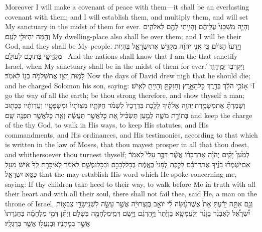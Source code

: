 {Moreover I will make a covenant of peace with them—it shall be an everlasting covenant with them; and I will establish them, and multiply them, and will set My sanctuary in the midst of them for ever.}
{וְהָיָ֤ה מִשְׁכָּנִי֙ עֲלֵיהֶ֔ם וְהָיִ֥יתִי לָהֶ֖ם לֵאלֹהִ֑ים וְהֵ֖מָּה יִהְיוּ\maqqaf לִ֥י לְעָֽם׃}
{My dwelling-place also shall be over them; and I will be their God, and they shall be My people.}
{וְיָֽדְעוּ֙ הַגּוֹיִ֔ם כִּ֚י אֲנִ֣י יְהֹוָ֔ה מְקַדֵּ֖שׁ אֶת\maqqaf יִשְׂרָאֵ֑ל בִּהְי֧וֹת מִקְדָּשִׁ֛י בְּתוֹכָ֖ם לְעוֹלָֽם׃ \petucha }
{And the nations shall know that I am the \lord\space that sanctify Israel, when My sanctuary shall be in the midst of them for ever.’}
\label{haft_12}
\setcounter{chap}{2}
\setcounter{verse}{1}
{וַיִּקְרְב֥וּ יְמֵֽי\maqqaf דָוִ֖ד לָמ֑וּת וַיְצַ֛ו אֶת\maqqaf שְׁלֹמֹ֥ה בְנ֖וֹ לֵאמֹֽר׃}
{Now the days of David drew nigh that he should die; and he charged Solomon his son, saying:}
{אָנֹכִ֣י הֹלֵ֔ךְ בְּדֶ֖רֶךְ כׇּל\maqqaf הָאָ֑רֶץ וְחָזַקְתָּ֖ וְהָיִ֥יתָֽ לְאִֽישׁ׃}
{‘I go the way of all the earth; be thou strong therefore, and show thyself a man;}
{וְשָׁמַרְתָּ֞ אֶת\maqqaf מִשְׁמֶ֣רֶת \legarmeh  יְהֹוָ֣ה אֱלֹהֶ֗יךָ לָלֶ֤כֶת בִּדְרָכָיו֙ לִשְׁמֹ֨ר חֻקֹּתָ֤יו מִצְוֺתָיו֙ וּמִשְׁפָּטָ֣יו וְעֵדְוֺתָ֔יו כַּכָּת֖וּב בְּתוֹרַ֣ת מֹשֶׁ֑ה לְמַ֣עַן תַּשְׂכִּ֗יל אֵ֚ת כׇּל\maqqaf אֲשֶׁ֣ר תַּעֲשֶׂ֔ה וְאֵ֛ת כׇּל\maqqaf אֲשֶׁ֥ר תִּפְנֶ֖ה שָֽׁם׃}
{and keep the charge of the \lord\space thy God, to walk in His ways, to keep His statutes, and His commandments, and His ordinances, and His testimonies, according to that which is written in the law of Moses, that thou mayest prosper in all that thou doest, and whithersoever thou turnest thyself;}
{לְמַ֩עַן֩ יָקִ֨ים יְהֹוָ֜ה אֶת\maqqaf דְּבָר֗וֹ אֲשֶׁ֨ר דִּבֶּ֣ר עָלַי֮ לֵאמֹר֒ אִם\maqqaf יִשְׁמְר֨וּ בָנֶ֜יךָ אֶת\maqqaf דַּרְכָּ֗ם לָלֶ֤כֶת לְפָנַי֙ בֶּאֱמֶ֔ת בְּכׇל\maqqaf לְבָבָ֖ם וּבְכׇל\maqqaf נַפְשָׁ֑ם לֵאמֹ֕ר לֹֽא\maqqaf יִכָּרֵ֤ת לְךָ֙ אִ֔ישׁ מֵעַ֖ל כִּסֵּ֥א יִשְׂרָאֵֽל׃}
{that the \lord\space may establish His word which He spoke concerning me, saying: If thy children take heed to their way, to walk before Me in truth with all their heart and with all their soul, there shall not fail thee, said He, a man on the throne of Israel.}
{וְגַ֣ם אַתָּ֣ה יָדַ֡עְתָּ אֵת֩ אֲשֶׁר\maqqaf עָ֨שָׂה לִ֜י יוֹאָ֣ב בֶּן\maqqaf צְרוּיָ֗ה אֲשֶׁ֣ר עָשָׂ֣ה לִשְׁנֵֽי\maqqaf שָׂרֵ֣י צִבְא֣וֹת יִ֠שְׂרָאֵ֠ל לְאַבְנֵ֨ר בֶּן\maqqaf נֵ֜ר וְלַעֲמָשָׂ֤א בֶן\maqqaf יֶ֙תֶר֙ וַיַּ֣הַרְגֵ֔ם וַיָּ֥שֶׂם דְּמֵֽי\maqqaf מִלְחָמָ֖ה בְּשָׁלֹ֑ם וַיִּתֵּ֞ן דְּמֵ֣י מִלְחָמָ֗ה בַּחֲגֹֽרָתוֹ֙ אֲשֶׁ֣ר בְּמׇתְנָ֔יו וּֽבְנַעֲל֖וֹ אֲשֶׁ֥ר בְּרַגְלָֽיו׃}
